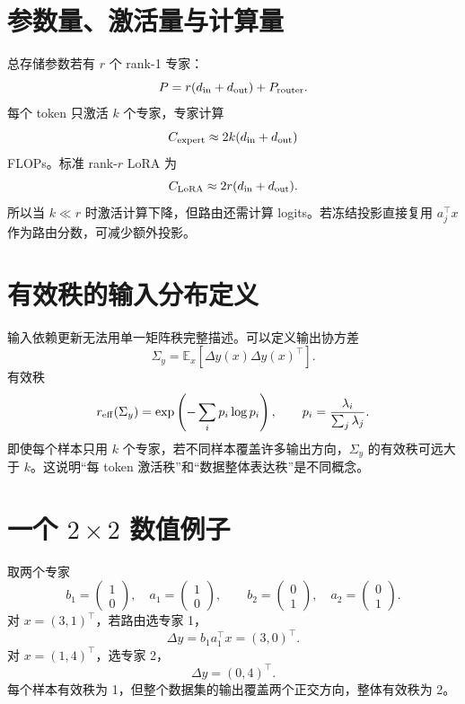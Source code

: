 \documentclass[UTF8,12pt,a4paper,fontset=none]{ctexart}
\numberwithin{equation}{section}
\newcommand{\E}{\mathbb{E}}
\begin{document}
\section{参数量、激活量与计算量}
总存储参数若有 $r$ 个 rank-1 专家：
\begin{equation}
 P=r(d_{\rm in}+d_{\rm out})+P_{\rm router}.
\end{equation}
每个 token 只激活 $k$ 个专家，专家计算
\begin{equation}
 C_{\rm expert}\approx2k(d_{\rm in}+d_{\rm out})
\end{equation}
FLOPs。标准 rank-$r$ LoRA 为
\begin{equation}
 C_{\rm LoRA}\approx2r(d_{\rm in}+d_{\rm out}).
\end{equation}
所以当 $k\ll r$ 时激活计算下降，但路由还需计算 logits。若冻结投影直接复用 $a_j^\top x$ 作为路由分数，可减少额外投影。

\section{有效秩的输入分布定义}
输入依赖更新无法用单一矩阵秩完整描述。可以定义输出协方差
\begin{equation}
 \Sigma_y=\E_x[\Delta y(x)\Delta y(x)^\top].
\end{equation}
有效秩
\begin{equation}
 r_{\rm eff}(\Sigma_y)=
 \exp\left(-\sum_i p_i\log p_i\right),
 \qquad p_i=\frac{\lambda_i}{\sum_j\lambda_j}.
\end{equation}
即使每个样本只用 $k$ 个专家，若不同样本覆盖许多输出方向，$\Sigma_y$ 的有效秩可远大于 $k$。这说明“每 token 激活秩”和“数据整体表达秩”是不同概念。

\section{一个 $2\times2$ 数值例子}
取两个专家
\begin{equation}
 b_1=\begin{pmatrix}1\\0\end{pmatrix},\quad
 a_1=\begin{pmatrix}1\\0\end{pmatrix},\qquad
 b_2=\begin{pmatrix}0\\1\end{pmatrix},\quad
 a_2=\begin{pmatrix}0\\1\end{pmatrix}.
\end{equation}
对 $x=(3,1)^\top$，若路由选专家 1，
\begin{equation}
 \Delta y=b_1a_1^\top x=(3,0)^\top.
\end{equation}
对 $x=(1,4)^\top$，选专家 2，
\begin{equation}
 \Delta y=(0,4)^\top.
\end{equation}
每个样本有效秩为 1，但整个数据集的输出覆盖两个正交方向，整体有效秩为 2。
\end{document}
